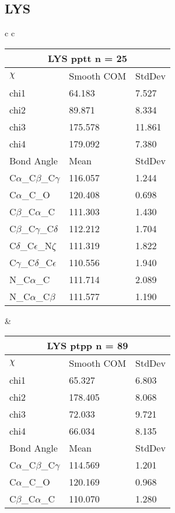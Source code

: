 \newpage
\subsection{LYS}

\begin{longtable}{ c c }

  \begin{tabular}{ l l l }
  \toprule
  \multicolumn{3}{c}{LYS \textbf{pptt} n = 25} \\ \toprule
  $\chi$       & Smooth COM & StdDev \\ \midrule
  chi1 & 64.183 & 7.527 \\ 
  chi2 & 89.871 & 8.334 \\ 
  chi3 & 175.578 & 11.861 \\ 
  chi4 & 179.092 & 7.380 \\ \midrule
  Bond Angle   & Mean     & StdDev \\ \midrule
  C$\alpha$\_C$\beta$\_C$\gamma$ & 116.057 & 1.244\\
  C$\alpha$\_C\_O & 120.408 & 0.698\\
  C$\beta$\_C$\alpha$\_C & 111.303 & 1.430\\
  C$\beta$\_C$\gamma$\_C$\delta$ & 112.212 & 1.704\\
  C$\delta$\_C$\epsilon$\_N$\zeta$ & 111.319 & 1.822\\
  C$\gamma$\_C$\delta$\_C$\epsilon$ & 110.556 & 1.940\\
  N\_C$\alpha$\_C & 111.714 & 2.089\\
  N\_C$\alpha$\_C$\beta$ & 111.577 & 1.190\\
  \bottomrule
  \end{tabular}
  &
  \begin{tabular}{ l l l }
  \toprule
  \multicolumn{3}{c}{LYS \textbf{ptpp} n = 89} \\ \toprule
  $\chi$       & Smooth COM & StdDev \\ \midrule
  chi1 & 65.327 & 6.803 \\ 
  chi2 & 178.405 & 8.068 \\ 
  chi3 & 72.033 & 9.721 \\ 
  chi4 & 66.034 & 8.135 \\ \midrule
  Bond Angle   & Mean     & StdDev \\ \midrule
  C$\alpha$\_C$\beta$\_C$\gamma$ & 114.569 & 1.201\\
  C$\alpha$\_C\_O & 120.169 & 0.968\\
  C$\beta$\_C$\alpha$\_C & 110.070 & 1.280\\

\end{tabular}
\end{longtable}
